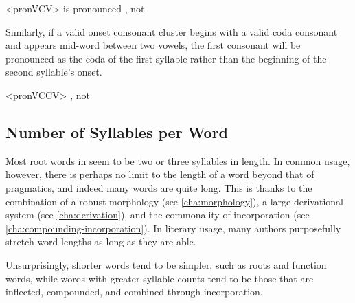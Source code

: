 \ex<pronVCV>
	   is pronounced  , not 
\xe

Similarly, if a valid onset consonant cluster begins with a valid coda consonant and appears mid-word between two vowels, the first consonant will be pronounced as the coda of the first syllable rather than the beginning of the second syllable's onset.

\ex<pronVCCV>
	   , not 
\xe

\subsection{Number of Syllables per Word}
\label{sec:syllable-counts}

Most root words in \lang{} seem to be two or three syllables in length. In common usage, however, there is perhaps no limit to the length of a word beyond that of pragmatics, and indeed many words are quite long. This is thanks to the combination of a robust morphology (see \autoref{cha:morphology}), a large derivational system (see \autoref{cha:derivation}), and the commonality of incorporation (see \autoref{cha:compounding-incorporation}). In literary usage, many authors purposefully stretch word lengths as long as they are able.

Unsurprisingly, shorter words tend to be simpler, such as roots and function words, while words with greater syllable counts tend to be those that are inflected, compounded, and combined through incorporation.

